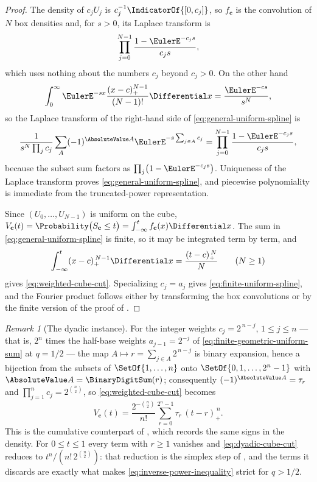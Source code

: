 \documentclass[11pt,a4paper,oneside,openany]{book}
\theoremstyle{definition}
\theoremstyle{remark}
\newtheorem{remark}[remark]{Remark}
\begin{document}
\begin{proof}
The density of $c_jU_j$ is $c_j^{-1}\IndicatorOf{[0,c_j]}$, so $f_{\mathbf c}$ is the convolution
of $N$ box densities and, for $s>0$, its Laplace transform is
\[
 \prod_{j=0}^{N-1}\frac{1-\EulerE^{-c_js}}{c_js},
\]
which uses nothing about the numbers $c_j$ beyond $c_j>0$.  On the other hand
\[
 \int_0^\infty\EulerE^{-sx}\frac{(x-c)_+^{N-1}}{(N-1)!}\Differential x=\frac{\EulerE^{-cs}}{s^N},
\]
so the Laplace transform of the right-hand side of \eqref{eq:general-uniform-spline} is
\[
 \frac1{s^N\prod_jc_j}\sum_A(-1)^{\AbsoluteValue A}\EulerE^{-s\sum_{j\in A}c_j}
 =\prod_{j=0}^{N-1}\frac{1-\EulerE^{-c_js}}{c_js},
\]
because the subset sum factors as $\prod_j\bigl(1-\EulerE^{-c_js}\bigr)$.  Uniqueness of the
Laplace transform proves \eqref{eq:general-uniform-spline}, and piecewise polynomiality is
immediate from the truncated-power representation.

Since $(U_0,\ldots,U_{N-1})$ is uniform on the cube,
$V_{\mathbf c}(t)=\Probability\bigl(S_{\mathbf c}\le t\bigr)
=\int_{-\infty}^{t}f_{\mathbf c}(x)\Differential x$.  The sum in
\eqref{eq:general-uniform-spline} is finite, so it may be integrated term by term, and
\[
 \int_{-\infty}^{t}(x-c)_+^{\,N-1}\Differential x=\frac{(t-c)_+^{\,N}}{N}
 \qquad(N\ge1)
\]
gives \eqref{eq:weighted-cube-cut}.  Specializing $c_j=a_j$ gives
\eqref{eq:finite-uniform-spline}, and the Fourier product follows either by transforming
the box convolutions or by the finite version of the proof of
.
\end{proof}

\begin{remark}[The dyadic instance]\label{rem:dyadic-cube-cut}
For the integer weights $c_j=2^{\,n-j}$, $1\le j\le n$ --- that is, $2^n$ times the
half-base weights $a_{j-1}=2^{-j}$ of \eqref{eq:finite-geometric-uniform-sum} at $q=1/2$
--- the map $A\mapsto r=\sum_{j\in A}2^{\,n-j}$ is binary expansion, hence a bijection
from the subsets of $\SetOf{1,\ldots,n}$ onto $\SetOf{0,1,\ldots,2^n-1}$ with
$\AbsoluteValue A=\BinaryDigitSum(r)$; consequently $(-1)^{\AbsoluteValue A}=\tau_r$ and
$\prod_{j=1}^{n}c_j=2^{\binom n2}$, so \eqref{eq:weighted-cube-cut} becomes
\begin{equation}\label{eq:dyadic-cube-cut}
 V_{\mathbf c}(t)=\frac{2^{-\binom n2}}{n!}\sum_{r=0}^{2^n-1}\tau_r\,(t-r)_+^{\,n}.
\end{equation}
This is the cumulative counterpart of , which records
the same signs in the density.  For $0\le t\le1$ every term with $r\ge1$ vanishes and
\eqref{eq:dyadic-cube-cut} reduces to $t^n/(n!\,2^{\binom n2})$: that reduction is the
simplex step of , and the terms it discards are exactly
what makes \eqref{eq:inverse-power-inequality} strict for $q>1/2$.
\end{remark}
\end{document}
